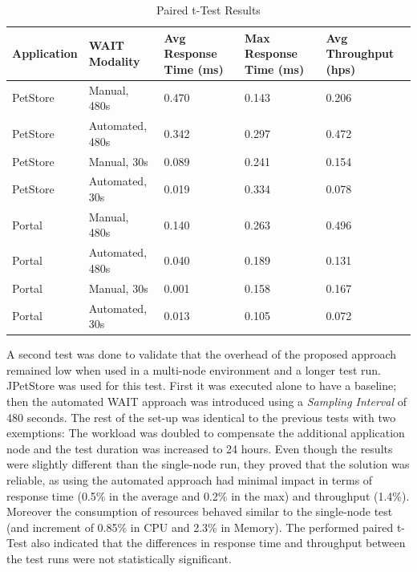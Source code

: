 \documentclass[runningheads,a4paper]{llncs}
\begin{document}
\begin{table}[!h]
\caption{Paired t-Test Results}
\label{tTest1}
\centering
\begin{tabular}{p{}|p{}|p{}|p{}|p{}}
\hline
\bfseries Application & \bfseries WAIT Modality & \bfseries Avg Response Time
(ms)& \bfseries Max Response Time (ms)& \bfseries Avg Throughput (hps)\\
\hline
PetStore & 	Manual, 480s 			& 0.470 & 0.143	& 0.206\\
PetStore & 	Automated, 480s 		& 0.342	& 0.297	& 0.472\\
PetStore & 	Manual, 30s 			& 0.089	& 0.241	& 0.154\\
PetStore & 	Automated, 30s 			& 0.019	& 0.334	& 0.078\\
\hline
Portal 	& 	Manual, 480s 			& 0.140 & 0.263	& 0.496\\
Portal 	& 	Automated, 480s 		& 0.040	& 0.189	& 0.131\\
Portal 	& 	Manual, 30s 			& 0.001	& 0.158	& 0.167\\
Portal 	& 	Automated, 30s 			& 0.013	& 0.105	& 0.072\\
\hline
\end{tabular}
\end{table}

A second test was done to validate that the overhead of the proposed approach
remained low when used in a multi-node environment and a longer test run.
JPetStore was used for this test. First it was executed alone to have a
baseline; then the automated WAIT approach was introduced using a \emph{Sampling
Interval} of 480 seconds. The rest of the set-up was identical to the previous
tests with two exemptions: The workload was doubled to compensate the additional
application node and the test duration was increased to 24 hours. Even though
the results were slightly different than the single-node run, they proved that
the solution was reliable, as using the automated approach had minimal impact in
terms of response time (0.5\% in the average and 0.2\% in the max) and
throughput (1.4\%). Moreover the consumption of resources behaved similar to the
single-node test (and increment of 0.85\% in CPU and 2.3\% in Memory).
The performed paired t-Test also indicated that the differences in response time
and throughput between the test runs were not statistically significant.
\end{document}
